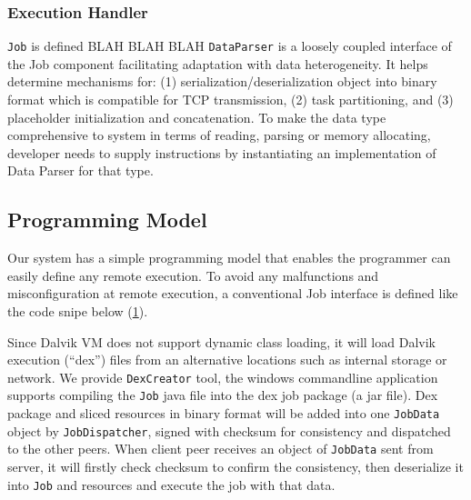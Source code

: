\documentclass[conference]{IEEEtran}
\begin{document}
\subsubsection{Execution Handler}
\texttt{Job} is defined BLAH BLAH BLAH
\texttt{DataParser} is a loosely coupled interface of the Job component facilitating adaptation with data heterogeneity. It helps determine mechanisms for: (1) serialization/deserialization object into binary format which is compatible for TCP transmission, (2) task partitioning, and (3) placeholder initialization and concatenation. To make the data type comprehensive to system in terms of reading, parsing or memory allocating, developer needs to supply instructions by instantiating an implementation of Data Parser for that type. 

\subsection{Programming Model} 
Our system has a simple programming model that enables the programmer can easily define any remote execution. To avoid any malfunctions and misconfiguration at remote execution, a conventional Job interface is defined like the code snipe below (\ref{code:job_def}).

\begin{figure}
\noindent {}	
	\label{code:job_def}
\end{figure}


Since Dalvik VM does not support dynamic class loading, it will load Dalvik execution (``dex'') files from an alternative locations such as internal storage or network. We provide \texttt{DexCreator} tool, the windows commandline application supports compiling the \texttt{Job} java file into the dex job package (a jar file). Dex package and sliced resources in binary format will be added into one \texttt{JobData} object by \texttt{JobDispatcher}, signed with checksum for consistency and dispatched to the other peers. When client peer receives an object of \texttt{JobData} sent from server, it will firstly check checksum to confirm the consistency, then deserialize it into \texttt{Job} and resources and execute the job with that data.
\end{document}
